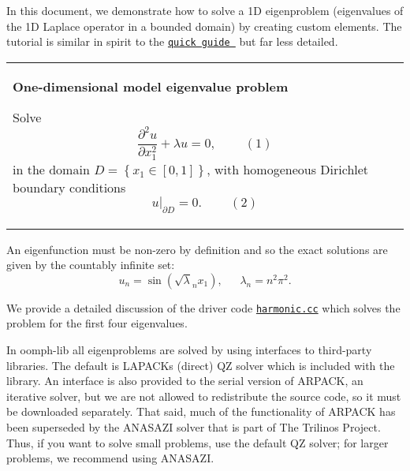 In this document, we demonstrate how to solve a 1D eigenproblem (eigenvalues of the 1D Laplace operator in a bounded domain) by creating custom elements. The tutorial is similar in spirit to the \href{../../../quick_guide/html/index.html}{\tt quick guide } but far less detailed. \begin{center} \tabulinesep=1mm
\begin{longtabu} spread 0pt [c]{*{1}{|X[-1]}|}
\hline
\begin{center} {\bfseries One-\/dimensional model eigenvalue problem} \end{center}  Solve \[ \frac{\partial^2u}{\partial x_1^2} + \lambda u = 0, \ \ \ \ \ \ \ \ \ \ (1) \] in the domain $D =\left\{ x_1 \in [0,1] \right\}$, with homogeneous Dirichlet boundary conditions \[ \left. u\right|_{\partial D}=0. \ \ \ \ \ \ \ \ \ \ (2) \]   \\
\end{longtabu}
\end{center} 

An eigenfunction must be non-\/zero by definition and so the exact solutions are given by the countably infinite set\+: \[ u_{n} = \sin (\sqrt{\lambda}_{n} x_{1}), \ \ \ \ \ \ \ \lambda_{n} = n^{2}\pi^{2}. \]

We provide a detailed discussion of the driver code \href{../../../../demo_drivers/eigenproblems/harmonic/harmonic.cc}{\tt harmonic.\+cc} which solves the problem for the first four eigenvalues.

In {\ttfamily oomph-\/lib} all eigenproblems are solved by using interfaces to third-\/party libraries. The default is L\+A\+P\+A\+CK\textquotesingle{}s (direct) QZ solver which is included with the library. An interface is also provided to the serial version of A\+R\+P\+A\+CK, an iterative solver, but we are not allowed to redistribute the source code, so it must be downloaded separately. That said, much of the functionality of A\+R\+P\+A\+CK has been superseded by the A\+N\+A\+S\+A\+ZI solver that is part of The Trilinos Project. Thus, if you want to solve small problems, use the default QZ solver; for larger problems, we recommend using A\+N\+A\+S\+A\+ZI.



 


